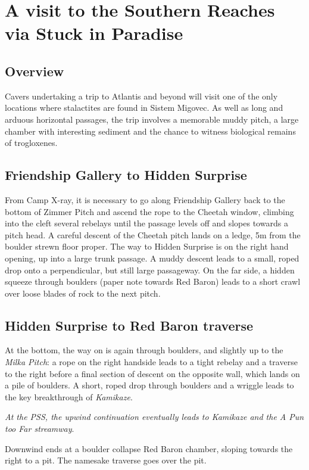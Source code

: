 \section{A visit to the Southern Reaches via Stuck in Paradise}

\subsection{Overview} 
Cavers undertaking a trip to Atlantis and beyond will visit one of the only locations where stalactites are found in Sistem Migovec. As well as long and arduous horizontal passages, the trip involves a memorable muddy pitch, a large chamber with interesting sediment and the chance to witness biological remains of trogloxenes.

\subsection{Friendship Gallery to Hidden Surprise}
From Camp X-ray, it is necessary to go along Friendship Gallery back to the bottom of Zimmer Pitch and ascend the rope to the Cheetah window, climbing into the cleft several rebelays until the passage levels off and slopes towards a pitch head. A careful descent of the Cheetah pitch lands on a ledge, 5m from the boulder strewn floor proper. The way to Hidden Surprise is on the right hand opening, up into a large trunk passage. A muddy descent leads to a small, roped drop onto a perpendicular, but still large passageway. On the far side, a hidden squeeze through boulders (paper note towards Red Baron) leads to a short crawl over loose blades of rock to the next pitch.
\subsection{Hidden Surprise to Red Baron traverse}
At the bottom, the way on is again through boulders, and slightly up to the \emph{Milka Pitch}: a rope on the right handside leads to a tight rebelay and a traverse to the right before a final section of descent on the opposite wall, which lands on a pile of boulders. A short, roped drop through boulders and a wriggle leads to the key breakthrough of \emph{Kamikaze}. 

\textit{At the PSS, the upwind continuation eventually leads to \emph{Kamikaze} and the \emph{A Pun too Far} streamway}. 

Downwind ends at a boulder collapse  Red Baron chamber, sloping towards the right to a pit. The namesake traverse goes over the pit.

